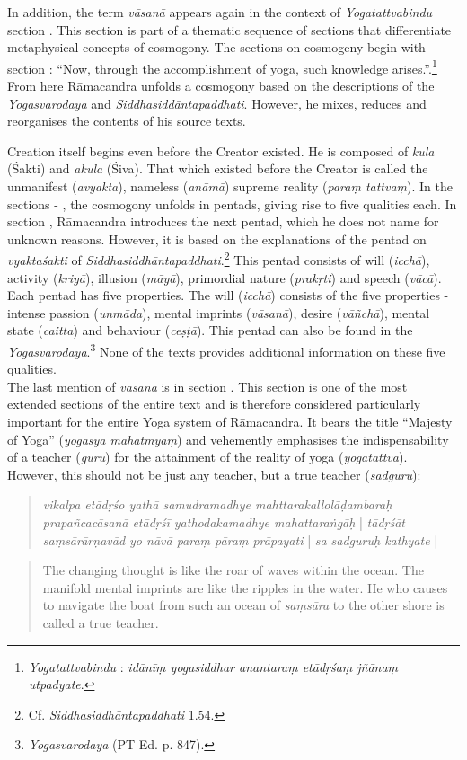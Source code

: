     In addition, the term \textit{vāsanā} appears again in the context of \textit{Yogatattvabindu} section . This section is part of a thematic sequence of sections that differentiate metaphysical concepts of cosmogony. The sections on cosmogeny begin with section : ``Now, through the accomplishment of yoga, such knowledge arises.''.\footnote{\textit{Yogatattvabindu} : \textit{idānīṃ yogasiddhar anantaraṃ etādṛśaṃ jñānaṃ utpadyate}.} From here Rāmacandra unfolds a cosmogony based on the descriptions of the \textit{Yogasvarodaya} and \textit{Siddhasiddāntapaddhati}. However, he mixes, reduces and reorganises the contents of his source texts.

Creation itself begins even before the Creator existed. He is composed of \textit{kula} (Śakti) and \textit{akula} (Śiva). That which existed before the Creator is called the unmanifest (\textit{avyakta}), nameless (\textit{anāmā}) supreme reality (\textit{paraṃ tattvaṃ}). In the sections  - , the cosmogony unfolds in pentads, giving rise to five qualities each. In section , Rāmacandra introduces the next pentad, which he does not name for unknown reasons. However, it is based on the explanations of the pentad on \textit{vyaktaśakti} of \textit{Siddhasiddhāntapaddhati}.\footnote{Cf. \textit{Siddhasiddhāntapaddhati} 1.54.} This pentad consists of will (\textit{icchā}), activity (\textit{kriyā}), illusion (\textit{māyā}), primordial nature (\textit{prakṛti}) and speech (\textit{vācā}). Each pentad has five properties. The will (\textit{icchā}) consists of the five properties - intense passion (\textit{unmāda}), mental imprints (\textit{vāsanā}), desire (\textit{vāñchā}), mental state (\textit{caitta}) and behaviour (\textit{ceṣṭā}). This pentad can also be found in the \textit{Yogasvarodaya}.\footnote{\textit{Yogasvarodaya} (PT Ed. p. 847).} None of the texts provides additional information on these five qualities. \\

  The last mention of \textit{vāsanā} is in section . This section is one of the most extended sections of the entire text and is therefore considered particularly important for the entire Yoga system of Rāmacandra. It bears the title ``Majesty of Yoga'' (\textit{yogasya māhātmyaṃ}) and vehemently emphasises the indispensability of a teacher (\textit{guru}) for the attainment of the reality of yoga (\textit{yogatattva}). However, this should not be just any teacher, but a true teacher (\textit{sadguru}):
  \begin{quote}
    \textit{vikalpa etādṛśo yathā samudramadhye mahttarakallolāḍambaraḥ prapañcacāsanā etādṛśī yathodakamadhye mahattaraṅgāḥ} | \textit{tādṛśāt saṃsārārṇavād yo nāvā paraṃ pāraṃ prāpayati} | \textit{sa sadguruḥ kathyate} |
    \end{quote}
  \begin{quote}
    The changing thought is like the roar of waves within the ocean. The manifold mental imprints are like the ripples in the water. He who causes to navigate the boat from such an ocean of \textit{saṃsāra} to the other shore is called a true teacher.
  \end{quote}

